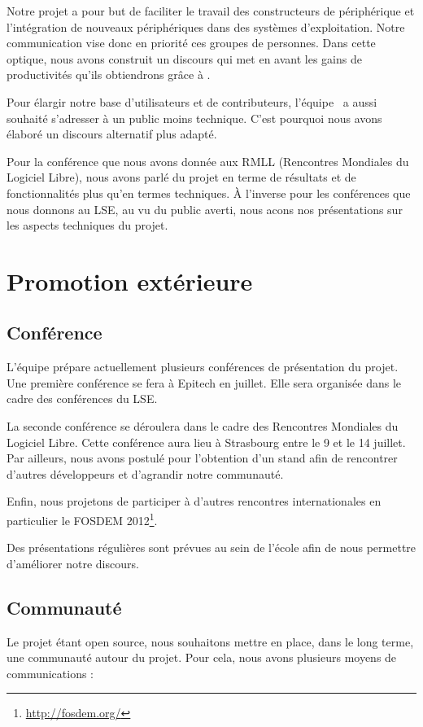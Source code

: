 \documentclass[francais]{rtxreport}
\begin{document}

Notre projet a pour but de faciliter le travail des constructeurs de
périphérique et l'intégration de nouveaux périphériques dans des systèmes
d'exploitation. Notre communication vise donc en priorité ces groupes de
personnes. Dans cette optique, nous avons construit un discours qui met en avant
les gains de productivités qu'ils obtiendrons grâce à \rtx.

Pour élargir notre base d'utilisateurs et de contributeurs, l'équipe \rtx\ a
aussi souhaité s'adresser à un public moins technique. C'est pourquoi nous avons
élaboré un discours alternatif plus adapté.

Pour la conférence que nous avons donnée aux RMLL (Rencontres Mondiales du
Logiciel Libre), nous avons parlé du projet en terme de résultats et de
fonctionnalités plus qu'en termes techniques. À l'inverse pour les conférences
que nous donnons au LSE, au vu du public averti, nous acons nos présentations
sur les aspects techniques du projet.

\chapter{Promotion extérieure}

\section{Conférence}
L'équipe prépare actuellement plusieurs conférences de présentation du projet.
Une première conférence se fera à Epitech en juillet. Elle sera organisée dans
le cadre des conférences du LSE.

La seconde conférence se déroulera dans le cadre des Rencontres Mondiales du
Logiciel Libre. Cette conférence aura lieu à Strasbourg entre le 9 et le 14
juillet. Par ailleurs, nous avons postulé pour l'obtention d'un stand afin de
rencontrer d'autres développeurs et d'agrandir notre communauté.

Enfin, nous projetons de participer à d'autres rencontres internationales en
particulier le FOSDEM 2012\footnote{\url{http://fosdem.org/}}.

Des présentations régulières sont prévues au sein de l'école afin de nous
permettre d'améliorer notre discours.

\section{Communauté}
Le projet étant open source, nous souhaitons mettre en place, dans le long
terme, une communauté autour du projet. Pour cela, nous avons plusieurs moyens
de communications :
\end{document}
